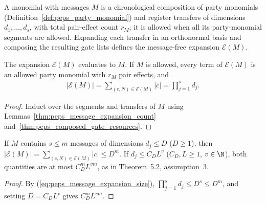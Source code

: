 \begin{definition}
    \label{def:peps_message_monomial}
    \leanok
    A monomial with messages $M$ is a chronological composition of party
    monomials (Definition~\ref{def:peps_party_monomial}) and register transfers
    of dimensions $d_1,\ldots,d_s$, with total pair-effect count $r_M$; it is
    allowed when all its party-monomial segments are allowed. Expanding each
    transfer in an orthonormal basis and composing the resulting gate lists
    defines the message-free expansion $\mathcal E(M)$.
\end{definition}

\begin{lemma}
    \label{thm:peps_message_expansion}
    \leanok
    The expansion $\mathcal E(M)$ evaluates to $M$. If $M$ is allowed, every
    term of $\mathcal E(M)$ is an allowed party monomial with $r_M$ pair
    effects, and
    \begin{align}
        |\mathcal E(M)|
        =\sum_{(c,N)\in\mathcal E(M)}|c|
        =\prod_{j=1}^{s}d_j.
        \label{eq:peps_message_expansion_size}
    \end{align}
\end{lemma}
\begin{proof}
    \leanok
    Induct over the segments and transfers of $M$ using
    Lemmas~\ref{thm:peps_message_expansion_count}
    and~\ref{thm:peps_composed_gate_resources}.
\end{proof}

\begin{lemma}
    \label{thm:peps_message_expansion_polynomial}
    \leanok
    If $M$ contains $s\le m$ messages of dimensions $d_j\le D$ ($D\ge 1$), then
    $|\mathcal E(M)|=\sum_{(c,N)\in\mathcal E(M)}|c|\le D^m$. If
    $d_j\le C_DL^v$ ($C_D,L\ge 1$, $v\in\N$), both quantities are at most
    $C_D^mL^{vm}$, as in Theorem~5.2, assumption~3.
\end{lemma}
\begin{proof}
    \leanok
    By (\ref{eq:peps_message_expansion_size}),
    $\prod_{j=1}^s d_j\le D^s\le D^m$, and setting $D=C_DL^v$ gives $C_D^mL^{vm}$.
\end{proof}

